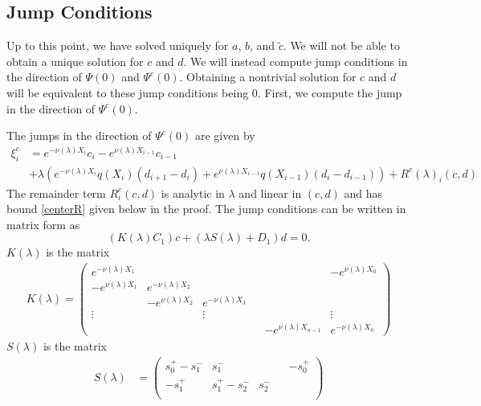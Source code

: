 \documentclass[thesis.tex]{subfiles}
\begin{document}
\subsection{Jump Conditions}

Up to this point, we have solved uniquely for $a$, $b$, and $\tilde{c}$. We will not be able to obtain a unique solution for $c$ and $d$. We will instead compute jump conditions in the direction of $\Psi(0)$ and $\Psi^c(0)$. Obtaining a nontrivial solution for $c$ and $d$ will be equivalent to these jump conditions being 0. First, we compute the jump in the direction of $\Psi^c(0)$. 

\begin{lemma}\label{jumpcenteradj}
The jumps in the direction of $\Psi^c(0)$ are given by
\begin{equation}\label{xic}
\begin{aligned}
\xi^c_i &= e^{-\nu(\lambda) X_i} c_i - e^{\nu(\lambda) X_{i-1}} c_{i-1} \\
&+ \lambda \left( e^{-\nu(\lambda)X_i} q(X_i) (d_{i+1} - d_i ) + e^{\nu(\lambda)X_{i-1}} q(X_{i-1}) (d_i - d_{i-1} )\right)  + R^c(\lambda)_i(c, d)
\end{aligned}
\end{equation}
The remainder term $R^c_i(c, d)$ is analytic in $\lambda$ and linear in $(c, d)$ and has bound \cref{centerR} given below in the proof. The jump conditions can be written in matrix form as
\begin{equation}\label{matrixjumpc}
(K(\lambda) C_1) c + (\lambda S(\lambda) + D_1) d = 0.
\end{equation}
$K(\lambda)$ is the matrix
\begin{align*}
K(\lambda) =  
\begin{pmatrix}
e^{-\nu(\lambda)X_1} & & & & & -e^{\nu(\lambda)X_0} \\
-e^{\nu(\lambda)X_1} & e^{-\nu(\lambda)X_2} \\
& -e^{\nu(\lambda)X_2} & e^{-\nu(\lambda)X_3} \\
\vdots & & \vdots & &&  \vdots \\
& & & & -e^{\nu(\lambda)X_{n-1}} & e^{-\nu(\lambda)X_0}
\end{pmatrix}
\end{align*}
$S(\lambda)$ is the matrix
\begin{align*}
S(\lambda) &= \begin{pmatrix}
s_0^+ - s_1^- & s_1^- &&& -s_0^+ \\
-s_1^+ & s_1^+ - s_2^- & s_2^- \\

\end{pmatrix}
\end{align*}
\end{lemma}
\end{document}
